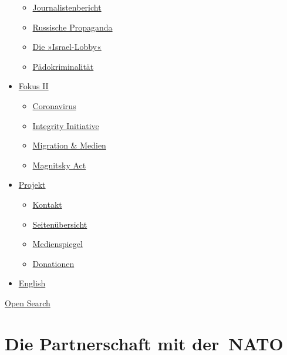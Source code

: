 \begin{itemize}
  \begin{itemize}
  \tightlist
  \item
    \href{https://swprs.org/bericht-eines-journalisten/}{Journalistenbericht}
  \item
    \href{https://swprs.org/russische-propaganda/}{Russische Propaganda}
  \item
    \href{https://swprs.org/die-israel-lobby-fakten-und-mythen/}{Die
    »Israel-Lobby«}
  \item
    \href{https://swprs.org/geopolitik-und-paedokriminalitaet/}{Pädokriminalität}
  \end{itemize}
\item
  \href{https://swprs.org/migration-und-medien/}{Fokus II}

  \begin{itemize}
  \tightlist
  \item
    \href{https://swprs.org/covid-19-hinweis-ii/}{Coronavirus}
  \item
    \href{https://swprs.org/die-integrity-initiative/}{Integrity
    Initiative}
  \item
    \href{https://swprs.org/migration-und-medien/}{Migration \& Medien}
  \item
    \href{https://swprs.org/der-fall-magnitsky/}{Magnitsky Act}
  \end{itemize}
\item
  \href{https://swprs.org/kontakt/}{Projekt}

  \begin{itemize}
  \tightlist
  \item
    \href{https://swprs.org/kontakt/}{Kontakt}
  \item
    \href{https://swprs.org/uebersicht/}{Seitenübersicht}
  \item
    \href{https://swprs.org/medienspiegel/}{Medienspiegel}
  \item
    \href{https://swprs.org/donationen/}{Donationen}
  \end{itemize}
\item
  \href{https://swprs.org/contact/}{English}
\end{itemize}

\protect\hyperlink{}{Open Search}

\hypertarget{die-partnerschaft-mit-der-nato}{%
\section{Die Partnerschaft mit
der~NATO}\label{die-partnerschaft-mit-der-nato}}

